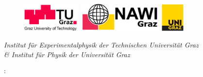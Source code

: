 \begin{titlepage}
   \begin{center}
       \begin{figure}[H]
            \begin{minipage}[h]{30mm}
                \centerline{\includegraphics[height=15mm]{cover_nudes/tugraz.png}}
            \end{minipage}
            \hfill
            \begin{minipage}[h]{30mm}
                \centerline{\includegraphics[height=15mm]{cover_nudes/nawi_graz.png}}
            \end{minipage}
            \hfill
            \begin{minipage}[h]{30mm}
                \centerline{\includegraphics[height=15mm]{cover_nudes/uni-graz.png}}
            \end{minipage}
        \end{figure}
        
        \large{\emph{Institut für Experimentalphysik der Technischen Universität Graz \\
        \& Institut für Physik der Universität Graz}} \\
        \vspace{5mm}
        
        {\Huge \textbf{\coursetitle}}
        \vspace{5mm}
        
        {\huge \laboratorynumber: \thetitle}
    \end{center}
    
    \vfill
    

\end{titlepage}
